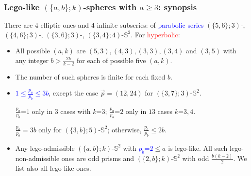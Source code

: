 \documentclass{beamer}
\begin{document}
\begin{frame}\frametitle{Lego-like   $(\{a,b\}; k)$-spheres with $a$$\ge$$3$: synopsis}
\vspace{-2mm}
There are $4$ elliptic ones and $4$ infinite subseries: of \textcolor{blue}{parabolic series}  
   $(\{5,6\}; 3)$-,  $(\{4,6\}; 3)$-, $(\{3,6\}; 3)$-, $(\{3,4\}; 4)$-$\mathbb{S}^2$. For \textcolor{red}{hyperbolic}:
\begin{itemize}
\item All possible $(a,k)$ are $(5,3),(4,3),(3,3),(3,4)$ and $(3,5)$ with 
any integer $b> \frac{2k}{k-2}$ for each of possible five $(a,k)$. 

\item The number of such spheres is finite for each fixed $b$.

\item \textcolor{blue}{$1\le \frac{p_a}{p_b}\le 3b$}, except the  case $\vec{p} = (12, 24)$ for
 $(\{3, 7\};3)$-$\mathbb{S}^2$.
 
 $\frac{p_a}{p_b}$=$1$ only in $3$ cases with $k$=$3$;  $\frac{p_a}{p_b}$=$2$ only in $13$ cases  $k$=$3,4$.  %
 
 $\frac{p_a}{p_b}=3b$ only for
 $(\{3, b\};5)$-$\mathbb{S}^2$; otherwise,  $\frac{p_a}{p_b}\le 2b$.  
 
 \item
 Any lego-admissible  $(\{a,b\}; k)$-$\mathbb{S}^2$ with \textcolor{blue}{$p_b$=$2$}$\le $$a$ is lego-like.
All such lego-non-admissible ones are odd prisms and $(\{2,b\}; k)$-$\mathbb{S}^2$ with odd $\frac{b(k-2)}{2}$.
We list also  all lego-like ones.

\end{itemize}
\end{frame}
\end{document}
